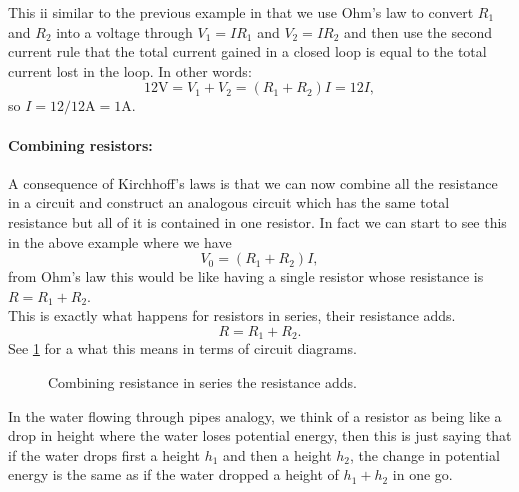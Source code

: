 This ii similar to the previous example in that we use Ohm's law to convert $R_{1}$ and $R_{2}$ into a voltage through $V_{1}=I R_{1}$ and $V_{2}=I R_{2}$ and then use the second current rule that the total current gained in a closed loop is equal to the total current lost in the loop. In other words:
\begin{equation*}
12\text{V}=V_{1}+V_{2}=\left(R_{1}+R_{2}\right)I=12I,
\end{equation*}
so $I=12/12 \text{A}=1\text{A}$.


\paragraph{Combining resistors:} A consequence of Kirchhoff's laws is that we can now combine all the resistance in a circuit and construct an analogous circuit which has the same total resistance but all of it is contained in one resistor. In fact we can start to see this in the above example where we have 
\begin{equation*}
V_{0}=\left(R_{1}+R_{2}\right)I,
\end{equation*}
from Ohm's law this would be like having a single resistor whose resistance is $R=R_{1}+R_{2}$. \\


This is exactly what happens for resistors in series, their resistance adds. 
\begin{equation}
R=R_{1}+R_{2}.
\label{eq: resistors in series}
\end{equation} 
See \cref{fig: resistance in series} for a what this means in terms of circuit diagrams.\\
  \begin{figure}[ht]
    \centering
    \caption{Combining resistance in series the resistance adds.}
    \label{fig: resistance in series}
\end{figure}

In the water flowing through pipes analogy, we think of a resistor as being like a drop in height where the water loses potential energy, then this is just saying that if the water drops first a height $h_{1}$ and then a height $h_{2}$, the change in potential energy is the same as if the water dropped a height of $h_{1}+h_{2}$ in one go.\\

